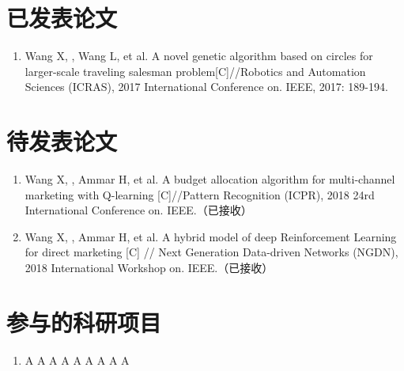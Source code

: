 ﻿\begin{publications}

\section*{已发表论文}

\begin{enumerate}
\item Wang X, , Wang L, et al. A novel genetic algorithm based on circles for larger-scale traveling salesman problem[C]//Robotics and Automation Sciences (ICRAS), 2017 International Conference on. IEEE, 2017: 189-194.
\end{enumerate}

\section*{待发表论文}

\begin{enumerate}
\item Wang X, , Ammar H, et al. A budget allocation algorithm for multi-channel marketing with Q-learning [C]//Pattern Recognition (ICPR), 2018 24rd International Conference on. IEEE.（已接收）
\item Wang X, , Ammar H, et al. A hybrid model of deep Reinforcement Learning for direct marketing [C] // Next Generation Data-driven Networks (NGDN), 2018 International Workshop on. IEEE.（已接收）
\end{enumerate}

\section*{参与的科研项目}
\begin{enumerate}
\item A A A A A A A A A
\end{enumerate}

\end{publications}
